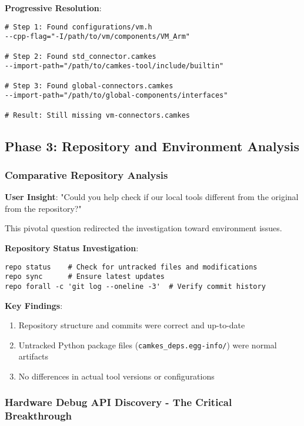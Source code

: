\documentclass[11pt,a4paper]{article}
\begin{document}
\textbf{Progressive Resolution}:
\begin{lstlisting}[caption=Include Path Resolution]
# Step 1: Found configurations/vm.h
--cpp-flag="-I/path/to/vm/components/VM_Arm"

# Step 2: Found std_connector.camkes  
--import-path="/path/to/camkes-tool/include/builtin"

# Step 3: Found global-connectors.camkes
--import-path="/path/to/global-components/interfaces"

# Result: Still missing vm-connectors.camkes
\end{lstlisting}

\subsection{Phase 3: Repository and Environment Analysis}

\subsubsection{Comparative Repository Analysis}

\textbf{User Insight}: "Could you help check if our local tools different from the original from the repository?"

This pivotal question redirected the investigation toward environment issues.

\textbf{Repository Status Investigation}:
\begin{lstlisting}[caption=Repository Analysis Commands]
repo status    # Check for untracked files and modifications
repo sync      # Ensure latest updates
repo forall -c 'git log --oneline -3'  # Verify commit history
\end{lstlisting}

\textbf{Key Findings}:
\begin{enumerate}
\item Repository structure and commits were correct and up-to-date
\item Untracked Python package files (\texttt{camkes\_deps.egg-info/}) were normal artifacts
\item No differences in actual tool versions or configurations
\end{enumerate}

\subsubsection{Hardware Debug API Discovery - The Critical Breakthrough}
\end{document}
